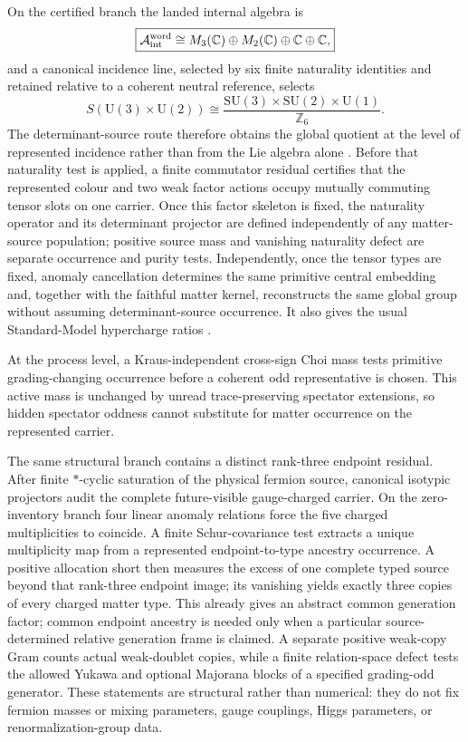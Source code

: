 \documentclass[11pt]{article}
\numberwithin{equation}{section}
\theoremstyle{definition}
\theoremstyle{remark}
\newcommand{\Z}{\mathbb Z}
\newcommand{\C}{\mathbb C}
\newcommand{\U}{\mathrm U}
\newcommand{\SU}{\mathrm{SU}}
\newcommand{\A}{\mathcal A}
\begin{document}
On the certified branch the landed internal algebra is
\begin{equation}
\boxed{
\A_{\rm int}^{\rm word}
\cong
M_3(\C)\oplus M_2(\C)\oplus\C\oplus\C,}
\label{eq:intro-internal-algebra}
\end{equation}
and a canonical incidence line, selected by six finite naturality identities
and retained relative to a coherent neutral reference, selects
\begin{equation}
\boxed{
S(\U(3)\times\U(2))
\cong
\frac{\SU(3)\times\SU(2)\times\U(1)}{\Z_6}.}
\label{eq:intro-gauge-group}
\end{equation}
The determinant-source route therefore obtains the global quotient at the
level of represented incidence rather than from the Lie algebra alone
\cite{Hucks1991,Tong2017}.  Before that naturality test is applied, a finite
commutator residual certifies that the represented colour and two weak factor
actions occupy mutually commuting tensor slots on one carrier.  Once this
factor skeleton is fixed, the naturality operator and its determinant projector
are defined independently of any matter-source population; positive source mass
and vanishing naturality defect are separate occurrence and purity tests.
Independently, once the tensor types are fixed, anomaly cancellation determines
the same primitive central embedding and, together with the faithful matter
kernel, reconstructs the same global group without assuming determinant-source
occurrence.  It also gives the usual Standard-Model hypercharge ratios
\cite{GengMarshak1989,MinahanRamondWarner1990,
AlvarezGraciaBondiaMartin1995}.

At the process level, a Kraus-independent cross-sign Choi mass tests primitive
grading-changing occurrence before a coherent odd representative is chosen.
This active mass is unchanged by unread trace-preserving spectator extensions,
so hidden spectator oddness cannot substitute for matter occurrence on the
represented carrier.

The same structural branch contains a distinct rank-three endpoint residual.
After finite $*$-cyclic saturation of the physical fermion source, canonical
isotypic projectors audit the complete future-visible gauge-charged carrier.
On the zero-inventory branch four linear anomaly relations force the five
charged multiplicities to coincide.  A finite Schur-covariance test extracts a
unique multiplicity map from a represented endpoint-to-type ancestry
occurrence.  A positive allocation short then measures the excess of one
complete typed source beyond that rank-three endpoint image; its vanishing
yields exactly three copies of every charged matter type.  This already
gives an abstract common generation factor; common endpoint ancestry is needed
only when a particular source-determined relative generation frame is claimed.
A separate positive weak-copy Gram counts actual weak-doublet copies, while a
finite relation-space defect tests the allowed Yukawa and optional Majorana
blocks of a specified grading-odd generator.  These statements are structural
rather than numerical: they do not fix fermion masses or mixing parameters,
gauge couplings, Higgs parameters, or renormalization-group data.
\end{document}
